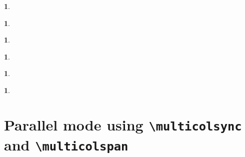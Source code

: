 \documentclass{article}
\theoremstyle{definition}
\newtheorem{definition}[theorem]{\GetTranslation{Definition}}
\begin{document}
\begin{multicols}

\begin{english}
\begin{definition}
\lipsum[1]
\end{definition}
\end{english}

\begin{cymraeg}
\begin{definition}
\lipsum[2]
\end{definition}
\end{cymraeg}

\begin{brezhoneg}
\begin{definition}
\lipsum[3]
\end{definition}
\end{brezhoneg}

\begin{francais}
\begin{definition}
\lipsum[4]
\end{definition}
\end{francais}

\begin{russkiy}
\begin{definition}
\lipsum[5]
\end{definition}
\end{russkiy}

\begin{thai}
\begin{definition}
\lipsum[6]
\end{definition}
\end{thai}

\end{multicols}

\section{Parallel mode using 
{\tt\textbackslash multicolsync}
and
{\tt\textbackslash multicolspan}}


\begin{multicols}

\cym{\lipsum[1]}
\eng{\lipsum[2]}
\bre{\lipsum[3]}
\fra{\lipsum[4]}
\rus{\lipsum[5]}
\tha{\lipsum[6]}

\multicolsync

\cym{\lipsum[7]}
\eng{\lipsum[8]}
\bre{\lipsum[9]}
\fra{\lipsum[10]}
\rus{\lipsum[11]}
\tha{\lipsum[12]}

\multicolspan{\lipsum[13]}

\cym{\lipsum[14]}
\eng{\lipsum[15]}
\bre{\lipsum[16]}
\fra{\lipsum[17]}
\rus{\lipsum[18]}
\tha{\lipsum[19]}

\end{multicols}
\end{document}
